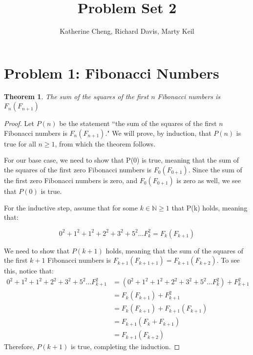 \documentclass[10pt,letter]{article}
\newtheorem*{thm}{Theorem}
\begin{document}

\title{Problem Set 2}

\author{Katherine Cheng, Richard Davis, Marty Keil}

 
\maketitle 


\section*{Problem 1: Fibonacci Numbers}

\begin{thm}The sum of the squares of the first $n$ Fibonacci numbers is $F_{n}(F_{n+1})$\end{thm}
\begin{proof}
Let $P(n)$ be the statement ``the sum of the squares of the first $n$ Fibonacci numbers is $F_{n}(F_{n+1})$." We will prove, by induction, that $P(n)$ is true for all $n\geq1$, from which the theorem follows. 

\item For our base case, we need to show that P(0) is true, meaning that the sum of the squares of the first zero Fibonacci numbers is $F_{0}(F_{0+1})$. Since the sum of the first zero Fibonacci numbers is zero, and $F_{0}(F_{0+1})$ is zero as well, we see that $P(0)$ is true.

\item For the inductive step, assume that for some $k \in \mathbb{N} \geq 1$ that P(k) holds, meaning that:

\begin{equation} \label{eq:1}
0^2 + 1^2 + 1^2 + 2^2 + 3^2 + 5^2 ... F_{k}^2 = F_{k}(F_{k+1})
\end{equation}

\item We need to show that $P(k+1)$ holds, meaning that the sum of the squares of the first $k+1$ Fibonacci numbers is $F_{k+1}(F_{k+1+1}) = F_{k+1}(F_{k+2})$. To see this, notice that:
\begin{align*}
0^2 + 1^2 + 1^2 + 2^2 + 3^2 + 5^2 ... F_{k+1}^2 &= (0^2 + 1^2 + 1^2 + 2^2 + 3^2 + 5^2 ... F_{k}^2) + F_{k+1}^2\\
&= F_{k}(F_{k+1}) + F_{k+1}^2 \tag{via (1)}\\ 
&= F_{k}(F_{k+1}) + F_{k+1}(F_{k+1})\\
&= F_{k+1}(F_{k}+F_{k+1})\\
&= F_{k+1}(F_{k+2})\tag{via Fibonacci recurrence relation}
\end{align*}
Therefore, $P(k+1)$ is true, completing the induction. 
\end{proof}
\end{document}
